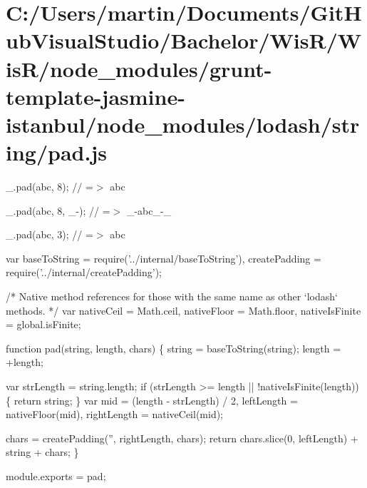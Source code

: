 \hypertarget{_c_1_2_users_2martin_2_documents_2_git_hub_visual_studio_2_bachelor_2_wis_r_2_wis_r_2node_modulefdea98b2efdcb3c7ebf331ef26b6fc49}{}\section{C\+:/\+Users/martin/\+Documents/\+Git\+Hub\+Visual\+Studio/\+Bachelor/\+Wis\+R/\+Wis\+R/node\+\_\+modules/grunt-\/template-\/jasmine-\/istanbul/node\+\_\+modules/lodash/string/pad.\+js}
\+\_\+.\+pad(\textquotesingle{}abc\textquotesingle{}, 8); // =$>$ \textquotesingle{} abc \textquotesingle{}

\+\_\+.\+pad(\textquotesingle{}abc\textquotesingle{}, 8, \textquotesingle{}\+\_\+-\/\textquotesingle{}); // =$>$ \textquotesingle{}\+\_\+-\/abc\+\_\+-\/\+\_\+\textquotesingle{}

\+\_\+.\+pad(\textquotesingle{}abc\textquotesingle{}, 3); // =$>$ \textquotesingle{}abc\textquotesingle{}


\begin{DoxyCodeInclude}
var baseToString = require(\textcolor{stringliteral}{'../internal/baseToString'}),
    createPadding = require(\textcolor{stringliteral}{'../internal/createPadding'});

\textcolor{comment}{/* Native method references for those with the same name as other `lodash` methods. */}
var nativeCeil = Math.ceil,
    nativeFloor = Math.floor,
    nativeIsFinite = global.isFinite;

\textcolor{keyword}{function} pad(\textcolor{keywordtype}{string}, length, chars) \{
  \textcolor{keywordtype}{string} = baseToString(\textcolor{keywordtype}{string});
  length = +length;

  var strLength = \textcolor{keywordtype}{string}.length;
  \textcolor{keywordflow}{if} (strLength >= length || !nativeIsFinite(length)) \{
    \textcolor{keywordflow}{return} string;
  \}
  var mid = (length - strLength) / 2,
      leftLength = nativeFloor(mid),
      rightLength = nativeCeil(mid);

  chars = createPadding(\textcolor{stringliteral}{''}, rightLength, chars);
  \textcolor{keywordflow}{return} chars.slice(0, leftLength) + \textcolor{keywordtype}{string} + chars;
\}

module.exports = pad;
\end{DoxyCodeInclude}
 